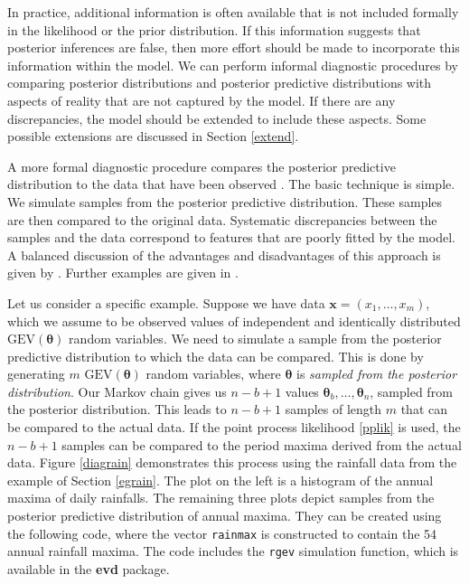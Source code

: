 \documentclass[11pt,a4paper]{article}
\newcommand{\bs}{\boldsymbol}
\begin{document}
In practice, additional information is often available that is not
included formally in the likelihood or the prior distribution.  If
this information suggests that posterior inferences are false, then
more effort should be made to incorporate this information within the
model.  We can perform informal diagnostic procedures by comparing
posterior distributions and posterior predictive distributions with
aspects of reality that are not captured by the model.  If there are
any discrepancies, the model should be extended to include these
aspects.  Some possible extensions are discussed in Section
\ref{extend}.

A more formal diagnostic procedure compares the posterior predictive
distribution to the data that have been observed \citep{gelmcarl95}.
The basic technique is simple.  We simulate samples from the posterior
predictive distribution.  These samples are then compared to the
original data.  Systematic discrepancies between the samples and the
data correspond to features that are poorly fitted by the model.  A
balanced discussion of the advantages and disadvantages of this
approach is given by \citet{bayaberg99, bayaberg00}.  Further examples
are given in \citet{gelmmengster96}.

Let us consider a specific example.  Suppose we have data $\bs{x} =
(x_1,\dots,x_m)$, which we assume to be observed values of independent
and identically distributed $\text{GEV}(\bs{\theta})$ random
variables.  We need to simulate a sample from the posterior predictive
distribution to which the data can be compared.  This is done by
generating $m$ $\text{GEV}(\bs{\theta})$ random variables, where
$\bs{\theta}$ is \emph{sampled from the posterior distribution}.  Our
Markov chain gives us $n-b+1$ values $\bs{\theta}_b, \dots,
\bs{\theta}_n$, sampled from the posterior distribution.  This leads
to $n-b+1$ samples of length $m$ that can be compared to the actual
data.  If the point process likelihood \eqref{pplik} is used, the
$n-b+1$ samples can be compared to the period maxima derived from the
actual data.  Figure \ref{diagrain} demonstrates this process using
the rainfall data from the example of Section \ref{egrain}.  The plot
on the left is a histogram of the annual maxima of daily rainfalls.
The remaining three plots depict samples from the posterior predictive
distribution of annual maxima.  They can be created using the
following code, where the vector \verb+rainmax+ is constructed to
contain the 54 annual rainfall maxima.  The code includes the
\verb+rgev+ simulation function, which is available in the
\textbf{evd} package.
\end{document}
